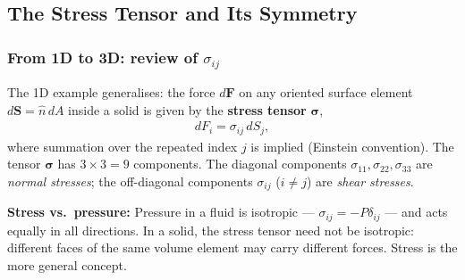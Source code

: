 \begin{center}
\end{center}

\subsection{The Stress Tensor and Its Symmetry}
\label{subsec:lec02:tensor}

\subsubsection*{From 1D to 3D: review of $\sigma_{ij}$}

The 1D example generalises: the force $d\mathbf{F}$ on any oriented
surface element $d\mathbf{S} = \hat{n}\,dA$ inside a solid is given by
the \textbf{stress tensor} $\bm{\sigma}$,
\begin{align}
    dF_i = \sigma_{ij}\,dS_j,
    \label{eq:lec02:cauchy_traction}
\end{align}
where summation over the repeated index $j$ is implied (Einstein
convention).  The tensor $\bm{\sigma}$ has $3\times 3 = 9$ components.
The diagonal components $\sigma_{11},\sigma_{22},\sigma_{33}$ are
\emph{normal stresses}; the off-diagonal components $\sigma_{ij}$ ($i\ne j$)
are \emph{shear stresses}.

\textbf{Stress vs.\ pressure:} Pressure in a fluid is isotropic —
$\sigma_{ij} = -P\delta_{ij}$ — and acts equally in all directions.
In a solid, the stress tensor need not be isotropic: different faces of
the same volume element may carry different forces.  Stress is the more
general concept.


